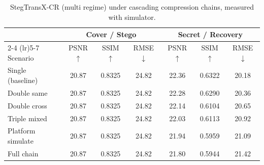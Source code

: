 \begin{table}[t]
\centering
\caption{StegTransX-CR (multi regime) under cascading compression chains, measured with simulator.}
\label{tab:multi-cascade-sim}
\begin{tabular}{lcccccc}
\toprule
& \multicolumn{3}{c}{Cover / Stego} & \multicolumn{3}{c}{Secret / Recovery} \\
\cmidrule(lr){2-4} \cmidrule(lr){5-7}
Scenario & PSNR $\uparrow$ & SSIM $\uparrow$ & RMSE $\downarrow$ & PSNR $\uparrow$ & SSIM $\uparrow$ & RMSE $\downarrow$ \\
\midrule
Single (baseline) & 20.87 & 0.8325 & 24.82 & 22.36 & 0.6322 & 20.18 \\
Double same & 20.87 & 0.8325 & 24.82 & 22.28 & 0.6290 & 20.36 \\
Double cross & 20.87 & 0.8325 & 24.82 & 22.14 & 0.6104 & 20.65 \\
Triple mixed & 20.87 & 0.8325 & 24.82 & 22.03 & 0.6113 & 20.92 \\
Platform simulate & 20.87 & 0.8325 & 24.82 & 21.94 & 0.5959 & 21.09 \\
Full chain & 20.87 & 0.8325 & 24.82 & 21.80 & 0.5944 & 21.42 \\
\bottomrule
\end{tabular}
\end{table}
